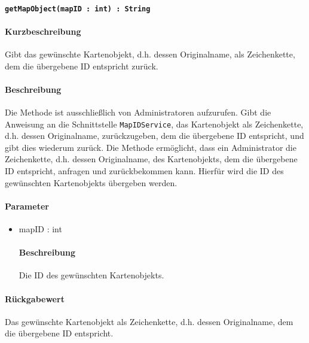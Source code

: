 \paragraph{\texttt{getMapObject(mapID : int) : String}}%
\paragraph*{Kurzbeschreibung}
Gibt das gewünschte Kartenobjekt, d.h. dessen Originalname, als Zeichenkette, dem die übergebene ID entspricht zurück.
\paragraph*{Beschreibung}
Die Methode ist ausschließlich von Administratoren aufzurufen.
Gibt die Anweisung an die Schnittstelle \texttt{MapIDService}, das Kartenobjekt als Zeichenkette, d.h. dessen Originalname, zurückzugeben, dem die übergebene ID entspricht, und gibt dies wiederum zurück.
Die Methode ermöglicht, dass ein Administrator die Zeichenkette, d.h. dessen Originalname, des Kartenobjekts, dem die übergebene ID entspricht, anfragen und zurückbekommen kann.
Hierfür wird die ID des gewünschten Kartenobjekts übergeben werden.
\paragraph*{Parameter}
\begin{itemize}
	\item mapID : int
		\paragraph*{Beschreibung}
		Die ID des gewünschten Kartenobjekts.
\end{itemize}
\paragraph*{Rückgabewert}
Das gewünschte Kartenobjekt als Zeichenkette, d.h. dessen Originalname, dem die übergebene ID entspricht.

